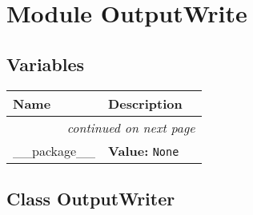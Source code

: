 %
%
%


\section{Module OutputWrite}

    \label{OutputWrite}


  \subsection{Variables}

    \vspace{-1cm}
\hspace{\varindent}\begin{longtable}{|p{\varnamewidth}|p{\vardescrwidth}|l}
\cline{1-2}
\cline{1-2} \centering \textbf{Name} & \centering \textbf{Description}& \\
\cline{1-2}
\endhead\cline{1-2}\multicolumn{3}{r}{\small\textit{continued on next page}}\\\endfoot\cline{1-2}
\endlastfoot\raggedright \_\-\_\-p\-a\-c\-k\-a\-g\-e\-\_\-\_\- & \raggedright \textbf{Value:} 
{\tt None}&\\
\cline{1-2}
\end{longtable}



\subsection{Class OutputWriter}

    \label{OutputWrite:OutputWriter}

